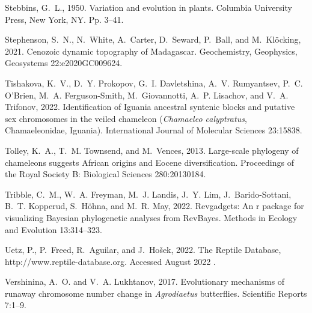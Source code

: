 \documentclass[a4paper, 12pt]{article}
\begin{document}
\begin{thebibliography}{73}
Stebbins, G.~L., 1950.
\newblock Variation and evolution in plants.
\newblock Columbia University Press, New York, NY. Pp. 3--41.

Stephenson, S.~N., N.~White, A.~Carter, D.~Seward, P.~Ball, and
  M.~Kl{\"o}cking, 2021.
\newblock Cenozoic dynamic topography of {M}adagascar.
\newblock Geochemistry, Geophysics, Geosystems 22:e2020GC009624.

Tishakova, K.~V., D.~Y. Prokopov, G.~I. Davletshina, A.~V. Rumyantsev, P.~C.
  O'Brien, M.~A. Ferguson-Smith, M.~Giovannotti, A.~P. Lisachov, and V.~A.
  Trifonov, 2022.
\newblock Identification of {I}guania ancestral syntenic blocks and putative
  sex chromosomes in the veiled chameleon (\textit{{C}hamaeleo calyptratus},
  {C}hamaeleonidae, {I}guania).
\newblock International Journal of Molecular Sciences 23:15838.

Tolley, K.~A., T.~M. Townsend, and M.~Vences, 2013.
\newblock Large-scale phylogeny of chameleons suggests {A}frican origins and
  {E}ocene diversification.
\newblock Proceedings of the Royal Society B: Biological Sciences 280:20130184.

Tribble, C.~M., W.~A. Freyman, M.~J. Landis, J.~Y. Lim, J.~Barido-Sottani,
  B.~T. Kopperud, S.~H{\"o}hna, and M.~R. May, 2022.
\newblock Revgadgets: An r package for visualizing {B}ayesian phylogenetic
  analyses from {R}ev{B}ayes.
\newblock Methods in Ecology and Evolution 13:314--323.

Uetz, P., P.~Freed, R.~Aguilar, and J.~Ho{\v s}ek, 2022.
\newblock The {R}eptile {D}atabase, http://www.reptile-database.org. {A}ccessed
  {A}ugust 2022 .

Vershinina, A.~O. and V.~A. Lukhtanov, 2017.
\newblock Evolutionary mechanisms of runaway chromosome number change in
  \textit{Agrodiaetus} butterflies.
\newblock Scientific Reports 7:1--9.


\end{thebibliography}
\end{document}
